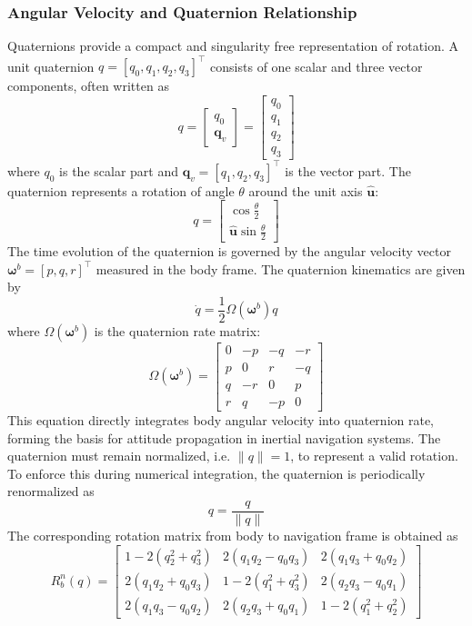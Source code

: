 \subsubsection{Angular Velocity and Quaternion Relationship}
Quaternions provide a compact and singularity free representation of rotation. A unit quaternion $q = [q_0, q_1, q_2, q_3]^\top$ consists of one scalar and three vector components, often written as
$$
    q = 
    \begin{bmatrix}
        q_0 \\ \mathbf{q}_v
    \end{bmatrix}
    =
    \begin{bmatrix}
        q_0 \\ q_1 \\ q_2 \\ q_3
    \end{bmatrix}
$$
where $q_0$ is the scalar part and $\mathbf{q}_v = [q_1, q_2, q_3]^\top$ is the vector part.  
The quaternion represents a rotation of angle $\theta$ around the unit axis $\hat{\mathbf{u}}$:
$$
    q =
    \begin{bmatrix}
        \cos\frac{\theta}{2} \\ \hat{\mathbf{u}}\sin\frac{\theta}{2}
    \end{bmatrix}
$$
The time evolution of the quaternion is governed by the angular velocity vector $\boldsymbol{\omega}^b = [p, q, r]^\top$ measured in the body frame. The quaternion kinematics are given by
$$
    \dot{q} = \frac{1}{2}\Omega(\boldsymbol{\omega}^b) q
$$
where $\Omega(\boldsymbol{\omega}^b)$ is the quaternion rate matrix:
$$
    \Omega(\boldsymbol{\omega}^b) =
    \begin{bmatrix}
        0 & -p & -q & -r \\
        p & 0 & r & -q \\
        q & -r & 0 & p \\
        r & q & -p & 0
    \end{bmatrix}
$$
This equation directly integrates body angular velocity into quaternion rate, forming the basis for attitude propagation in inertial navigation systems. The quaternion must remain normalized, i.e. $\|q\| = 1$, to represent a valid rotation. To enforce this during numerical integration, the quaternion is periodically renormalized as
$$
    q = \frac{q}{\|q\|}
$$
The corresponding rotation matrix from body to navigation frame is obtained as
$$
    R_b^n(q) =
    \begin{bmatrix}
        1 - 2(q_2^2 + q_3^2) & 2(q_1 q_2 - q_0 q_3) & 2(q_1 q_3 + q_0 q_2) \\
        2(q_1 q_2 + q_0 q_3) & 1 - 2(q_1^2 + q_3^2) & 2(q_2 q_3 - q_0 q_1) \\
        2(q_1 q_3 - q_0 q_2) & 2(q_2 q_3 + q_0 q_1) & 1 - 2(q_1^2 + q_2^2)
    \end{bmatrix}
$$
